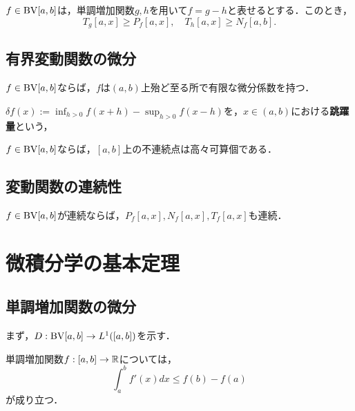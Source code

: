 \documentclass[uplatex, dvipdfmx]{jsreport}
\begin{document}
\begin{corollary}
    $f\in\mathrm{BV}[a,b]$は，単調増加関数$g,h$を用いて$f=g-h$と表せるとする．このとき，
    \[T_g[a,x]\ge P_f[a,x],\quad T_h[a,x]\ge N_f[a,b].\]
\end{corollary}

\subsection{有界変動関数の微分}

\begin{theorem}[Lebesgue]
    $f\in\mathrm{BV}[a,b]$ならば，$f$は$(a,b)$上殆ど至る所で有限な微分係数を持つ．
\end{theorem}

\begin{definition}[saltus]
    $\delta f(x):=\inf_{h>0}f(x+h)-\sup_{h>0}f(x-h)$を，$x\in(a,b)$における\textbf{跳躍量}という，
\end{definition}

\begin{theorem}
    $f\in\mathrm{BV}[a,b]$ならば，$[a,b]$上の不連続点は高々可算個である．
\end{theorem}

\subsection{変動関数の連続性}

\begin{theorem}
    $f\in\mathrm{BV}[a,b]$が連続ならば，$P_f[a,x],N_f[a,x],T_f[a,x]$も連続．
\end{theorem}

\section{微積分学の基本定理}

\subsection{単調増加関数の微分}

\begin{tcolorbox}[colframe=ForestGreen, colback=ForestGreen!10!white,breakable,colbacktitle=ForestGreen!40!white,coltitle=black,fonttitle=\bfseries\sffamily,
title=]
    まず，$D:\mathrm{BV}[a,b]\to L^1([a,b])$を示す．
\end{tcolorbox}

\begin{theorem}[Lebesgue]
    単調増加関数$f:[a,b]\to\mathbb{R}$については，
    \[\int^b_af'(x)dx\le f(b)-f(a)\]
    が成り立つ．
\end{theorem}
\end{document}
